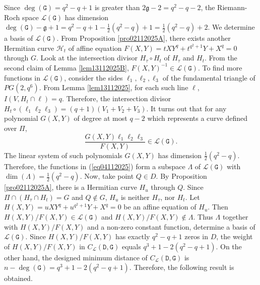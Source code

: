 \documentclass[9pt]{article}
\theoremstyle{plain}
\begin{document}
Since $\deg(\mathtt G)=q^2-q+1$ is greater than $2\mathfrak g-2=q^2-q-2$, the Riemann-Roch space $\mathcal{L}(\mathtt G)$ has dimension $\deg(\mathtt G)-\mathfrak g+1=q^2-q+1-\frac{1}{2}(q^2-q)+1=\frac{1}{2}(q^2-q)+2$. We determine  a basis of $\mathcal L(\mathtt G)$. From Proposition \ref{pro02112025A}, there exists another Hermitian curve $\mathcal{H}_t$ of affine equation $F(X,Y)=t XY^q+t^{q^2+1}Y+X^q=0$ through $G$. Look at the intersection divisor 
    $H_\tau\circ H_t$ of $H_\tau$ and $H_t$. 
From the second claim of Lemma \ref{lem13112025B}, 
$F(X,Y)^{-1}\in \mathcal{L}(\mathtt{G})$. To find more functions in $\mathcal{L}(\mathtt{G})$, consider the sides $\ell_1,\ell_2,\ell_3$ of the fundamental triangle of $PG(2,q^6)$. From Lemma \ref{lem13112025}, for each such line $\ell$, $I(V,H_t\cap \ell)=q$. Therefore, the intersection divisor $H_t\circ (\ell_1\ell_2\ell_3)=(q+1)(V_1+V_2+V_3)$. It turns out that for any polynomial $G(X,Y)$ of degree at most $q-2$ which represents a curve defined over $\Pi$, 
\begin{equation}
\label{eq04112025}
    \frac{G(X,Y)\ell_1\ell_2\ell_3}{F(X,Y)}\in \mathcal{L}(\mathtt{G}).
\end{equation}
The linear system of such polynomials $G(X,Y)$ has dimension $\frac{1}{2}(q^2-q)$. Therefore, the functions in (\ref{eq04112025}) form a subspace $\Lambda$ of $\mathcal{L}(\mathtt{G})$ with $\dim(\Lambda)=\frac{1}{2}(q^2-q)$. 
Now, take point $Q\in D$. By Proposition \ref{pro02112025A}, there is a Hermitian curve $H_u$ through $Q$. Since 
$\Pi\cap (H_\tau\cap H_t)=G$ and $Q\not\in G$, $H_u$ is neither $H_\tau$, nor $H_t$. Let $H(X,Y)=uXY^q+u^{q^2+1}Y+X^q=0$ 
be an affine equation of $H_u$. Then $H(X,Y)/F(X,Y)\in \mathcal{L}(\mathtt{G})$ and $H(X,Y)/F(X,Y)\not\in \Lambda$. 
Thus $\Lambda$ together with $H(X,Y)/F(X,Y)$ and a non-zero constant function, determine a basis of 
$\mathcal{L}(\mathtt{G})$. Since $H(X,Y)/F(X,Y)$ has exactly $q^2-q+1$ zeros in $D$, the weight of $H(X,Y)/F(X,Y)$ in $C_{\mathcal{L}}(\mathtt D,\mathtt G)$ equals $q^3+1-2(q^2-q+1)$. On the other hand, the designed minimum distance of $C_{\mathcal{L}}(\mathtt D,\mathtt G)$ is $n-\deg(\mathtt{G})=q^3+1-2(q^2-q+1)$. Therefore, the following result is obtained. 
\end{document}
